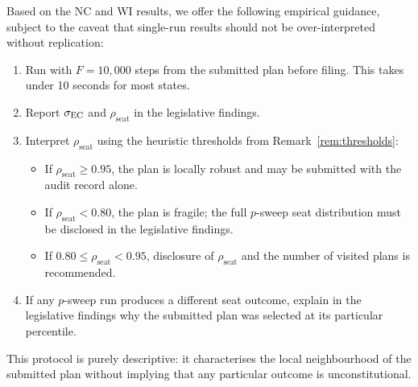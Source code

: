 Based on the NC and WI results, we offer the following empirical guidance,
subject to the caveat that single-run results should not be over-interpreted
without replication:
\begin{enumerate}
  \item Run \flip{} with $F = 10{,}000$ steps from the submitted plan before
        filing. This takes under 10 seconds for most states.
  \item Report $\sigma_{\mathrm{EC}}$ and $\rho_{\mathrm{seat}}$ in the legislative findings.
  \item Interpret $\rho_{\mathrm{seat}}$ using the heuristic thresholds from
        Remark~\ref{rem:thresholds}:
        \begin{itemize}
          \item If $\rho_{\mathrm{seat}} \geq 0.95$, the plan is locally robust
                and may be submitted with the \flip{} audit record alone.
          \item If $\rho_{\mathrm{seat}} < 0.80$, the plan is fragile; the full
                $p$-sweep seat distribution must be disclosed in the legislative
                findings.
          \item If $0.80 \leq \rho_{\mathrm{seat}} < 0.95$, disclosure of
                $\rho_{\mathrm{seat}}$ and the number of visited plans is
                recommended.
        \end{itemize}
  \item If any $p$-sweep run produces a different seat outcome, explain in the
        legislative findings why the submitted plan was selected at its
        particular percentile.
\end{enumerate}
This protocol is purely descriptive: it characterises the local neighbourhood
of the submitted plan without implying that any particular outcome is
unconstitutional.
